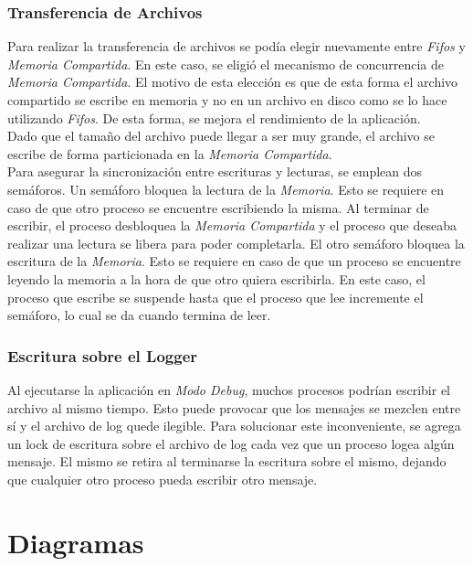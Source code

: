 \documentclass[a4paper,10pt]{article}
\begin{document}
			\subsubsection{Transferencia de Archivos}
			Para realizar la transferencia de archivos se pod\'ia elegir nuevamente entre \emph{Fifos} y \emph{Memoria Compartida}. En este caso,
			se eligi\'o el mecanismo de concurrencia de \emph{Memoria Compartida}. El motivo de esta elecci\'on es que de esta forma el archivo
			compartido se escribe en memoria y no en un archivo en disco como se lo hace utilizando \emph{Fifos}. De esta forma, se mejora el 
			rendimiento de la aplicaci\'on. \\
			\indent Dado que el tama\~no del archivo puede llegar a ser muy grande, el archivo se escribe de forma particionada en la 
			\emph{Memoria Compartida}. \\
			\indent Para asegurar la sincronizaci\'on entre escrituras y lecturas, se emplean dos sem\'aforos. Un sem\'aforo bloquea 
			la lectura de la \emph{Memoria}. Esto se requiere en caso de que otro proceso se encuentre escribiendo la misma. Al terminar
			de escribir, el proceso desbloquea la \emph{Memoria Compartida} y el proceso que deseaba realizar una lectura se libera para
			poder completarla. El otro sem\'aforo bloquea la escritura de la \emph{Memoria}. Esto se requiere en caso de que un proceso
			se encuentre leyendo la memoria a la hora de que otro quiera escribirla. En este caso, el proceso que escribe se suspende 
			hasta que el proceso que lee incremente el sem\'aforo, lo cual se da cuando termina de leer.
			

			\subsubsection{Escritura sobre el Logger} 
				Al ejecutarse la aplicaci\'on en \emph{Modo Debug}, muchos procesos podr\'ian escribir el archivo al mismo tiempo. Esto
			puede provocar que los mensajes se mezclen entre s\'i y el archivo de log quede ilegible.
			Para solucionar este inconveniente, se agrega un lock de escritura sobre el archivo de log cada vez que un proceso logea
			alg\'un mensaje. El mismo se retira al terminarse la escritura sobre el mismo, dejando que cualquier otro proceso pueda 
			escribir otro mensaje.

	\section{Diagramas}
		
\end{document}
